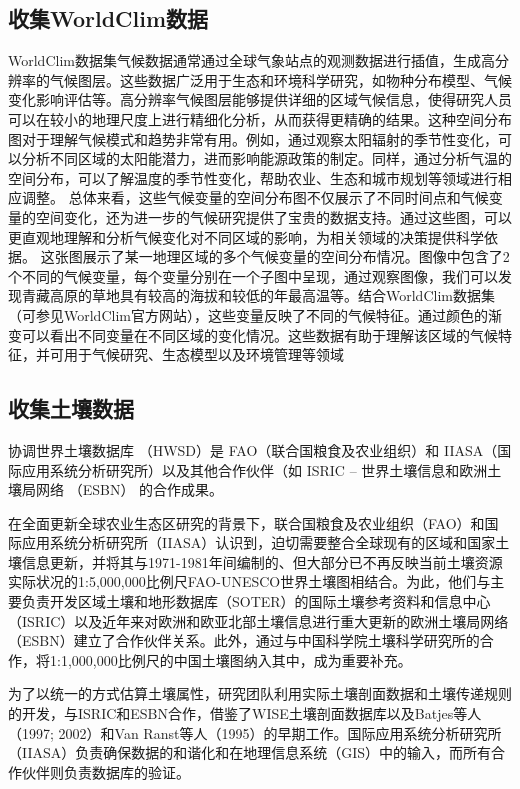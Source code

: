 \documentclass{article}
\begin{document}
	
	
	\subsection{收集WorldClim数据}
	
	WorldClim数据集气候数据通常通过全球气象站点的观测数据进行插值，生成高分辨率的气候图层。这些数据广泛用于生态和环境科学研究，如物种分布模型、气候变化影响评估等。高分辨率气候图层能够提供详细的区域气候信息，使得研究人员可以在较小的地理尺度上进行精细化分析，从而获得更精确的结果。这种空间分布图对于理解气候模式和趋势非常有用。例如，通过观察太阳辐射的季节性变化，可以分析不同区域的太阳能潜力，进而影响能源政策的制定。同样，通过分析气温的空间分布，可以了解温度的季节性变化，帮助农业、生态和城市规划等领域进行相应调整。
	总体来看，这些气候变量的空间分布图不仅展示了不同时间点和气候变量的空间变化，还为进一步的气候研究提供了宝贵的数据支持。通过这些图，可以更直观地理解和分析气候变化对不同区域的影响，为相关领域的决策提供科学依据。 这张图展示了某一地理区域的多个气候变量的空间分布情况。图像中包含了2个不同的气候变量，每个变量分别在一个子图中呈现，通过观察图像，我们可以发现青藏高原的草地具有较高的海拔和较低的年最高温等。结合WorldClim数据集（可参见WorldClim官方网站），这些变量反映了不同的气候特征。通过颜色的渐变可以看出不同变量在不同区域的变化情况。这些数据有助于理解该区域的气候特征，并可用于气候研究、生态模型以及环境管理等领域
	
	\subsection{收集土壤数据}
	协调世界土壤数据库 （HWSD）是 FAO（联合国粮食及农业组织）和 IIASA（国际应用系统分析研究所）以及其他合作伙伴（如 ISRIC – 世界土壤信息和欧洲土壤局网络 （ESBN） 的合作成果。
	
	在全面更新全球农业生态区研究的背景下，联合国粮食及农业组织（FAO）和国际应用系统分析研究所（IIASA）认识到，迫切需要整合全球现有的区域和国家土壤信息更新，并将其与1971-1981年间编制的、但大部分已不再反映当前土壤资源实际状况的1:5,000,000比例尺FAO-UNESCO世界土壤图相结合。为此，他们与主要负责开发区域土壤和地形数据库（SOTER）的国际土壤参考资料和信息中心（ISRIC）以及近年来对欧洲和欧亚北部土壤信息进行重大更新的欧洲土壤局网络（ESBN）建立了合作伙伴关系。此外，通过与中国科学院土壤科学研究所的合作，将1:1,000,000比例尺的中国土壤图纳入其中，成为重要补充。
	
	为了以统一的方式估算土壤属性，研究团队利用实际土壤剖面数据和土壤传递规则的开发，与ISRIC和ESBN合作，借鉴了WISE土壤剖面数据库以及Batjes等人（1997; 2002）和Van Ranst等人（1995）的早期工作。国际应用系统分析研究所（IIASA）负责确保数据的和谐化和在地理信息系统（GIS）中的输入，而所有合作伙伴则负责数据库的验证。
	
\end{document}
